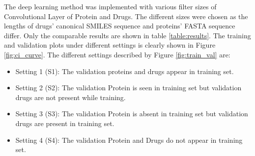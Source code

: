 
The deep learning method was implemented with various filter sizes of Convolutional Layer of Protein and Drugs. The different sizes were chosen as the lengths of drugs' canonical SMILES sequence and proteins' FASTA sequence differ. Only the comparable results are shown in table \ref{table:results}. The training and validation plots under different settings is clearly shown in Figure \ref{fig:ci_curve}. The different settings described by Figure \ref{fig:train_val} are:
\begin{itemize}
    \item Setting 1 (S1): The validation proteins and drugs appear in training set.
    \item Setting 2 (S2): The validation Protein is seen in training set but validation drugs are not present while training.
    \item Setting 3 (S3): The validation Protein is absent in training set but validation drugs are present in training set.
    \item Setting 4 (S4): The validation Protein and Drugs do not appear in training set.
\end{itemize}

